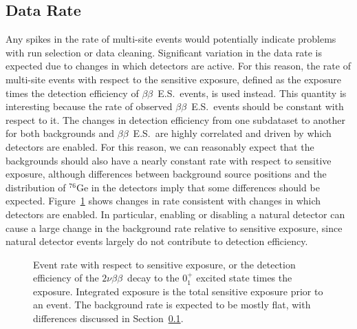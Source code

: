\documentclass[notitlepage,rmp,aps,10pt]{revtex4-1}
\newcommand{\bb}{${\beta \beta}$}
\newcommand{\tnbb}{${2 \nu \beta \beta}$}
\newcommand{\bbes}{\bb~E.S.}
\newcommand{\iso}[2]{$^{#1}$#2}
\newcommand{\Ge}[1]{\iso{#1}{Ge}}
\newcommand{\SP}[3]{$#1^{#2}_{#3}$}
\begin{document}
\subsection{Data Rate} \label{sec:ratecheck}
Any spikes in the rate of multi-site events would potentially indicate problems with run selection or data cleaning.
Significant variation in the data rate is expected due to changes in which detectors are active.
For this reason, the rate of multi-site events with respect to the sensitive exposure, defined as the exposure times the detection efficiency of \bbes\ events, is used instead.
This quantity is interesting because the rate of observed \bbes\ events should be constant with respect to it.
The changes in detection efficiency from one subdataset to another for both backgrounds and \bbes\ are highly correlated and driven by which detectors are enabled.
For this reason, we can reasonably expect that the backgrounds should also have a nearly constant rate with respect to sensitive exposure, although differences between background source positions and the distribution of \Ge{76} in the detectors imply that some differences should be expected.
Figure~\ref{fig:eventrate} shows changes in rate consistent with changes in which detectors are enabled.
In particular, enabling or disabling a natural detector can cause a large change in the background rate relative to sensitive exposure, since natural detector events largely do not contribute to detection efficiency.
\begin{figure}[ht]
  \centering
  \caption{\label{fig:eventrate}
    Event rate with respect to sensitive exposure, or the detection efficiency of the \tnbb\ decay to the \SP{0}{+}{1} excited state times the exposure. Integrated exposure is the total sensitive exposure prior to an event. The background rate is expected to be mostly flat, with differences discussed in Section~\ref{sec:ratecheck}.
  }
\end{figure}
\end{document}
